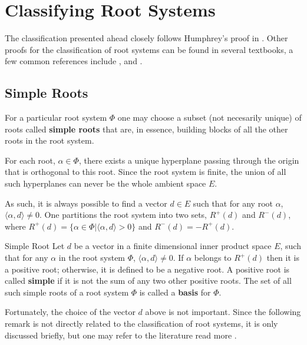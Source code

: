 \chapter{Classifying Root Systems}
The classification presented ahead closely follows Humphrey's proof in \cite{humphreys_1972}.
Other proofs for the classification of root systems can be found in several textbooks, a few common references include
\cite{fulton_harris_2004}, \cite{humphreys_1972} and  \cite{Tauvel2005}.

\section{Simple Roots}

For a particular root system $\Phi$ one may choose a subset (not necesarily unique) of
roots called \textbf{simple roots} that are, in essence, building blocks of all the other roots
in the root system. \newline

For each root, $\alpha \in \Phi$, there exists a unique hyperplane passing through the origin that
is orthogonal to this root. Since the root system is finite, the union of all
such hyperplanes can never be the whole ambient space $E$. \newline

As such, it is always possible to find a vector $d \in E$ such that for any root $\alpha$, $\langle \alpha, d \rangle \not= 0$.
One partitions the root system into two sets, $R^+(d)$ and $R^-(d)$, where $R^+(d) = \{
    \alpha \in \Phi |  \langle \alpha, d \rangle > 0\}$ and $R^-(d) = -R^+(d)$. \newline

\begin{nameddefinition}{Simple Root}
    Let $d$ be a vector in a finite dimensional inner product space $E$, such that for any $\alpha$ in the root system $\Phi$,
    $\langle \alpha, d \rangle \not= 0$. 
    If $\alpha$ belongs to $R^+(d)$ then it is a positive root; otherwise, it is defined
    to be a negative root.
    A positive root is called \textbf{simple} if it is not the sum of any two other positive roots.
    The set of all such simple roots of a root system $\Phi$ is called a \textbf{basis} for $\Phi$.
\end{nameddefinition}

Fortunately, the choice of the vector $d$ above is not important.
Since the following remark is not directly related to the classification of root systems, it is only
discussed briefly, but one may refer to the literature read more \cite{Humphreys_1990}. \newline

